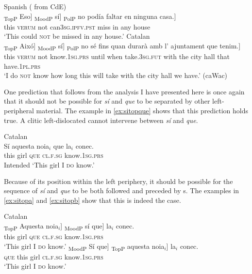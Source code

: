 \ea\label{ex:sino}
\ea\label{ex:sinosp}
		Spanish  (\citealt[94: ex 31a]{Kocher2017} from CdE)\\
\gll {\ob}\textsubscript{TopP} Eso] {\ob}\textsubscript{MoodP} sí] {\ob}\textsubscript{PolP} no podía faltar en ninguna casa.] \\
{} this {} \textsc{verum} {} not can\textsc{3sg.ipfv.pst} miss in any house\\
\glt `This could \textsc{not} be missed in any house.'
\ex\label{ex:sinocat} Catalan\\
\gll {\ob}\textsubscript{TopP} Aixó] {\ob}\textsubscript{MoodP} sí] {\ob}\textsubscript{PolP}  no sé fins quan durarà amb l' ajuntament que tenim.]\\
{} this {} \textsc{verum} {} not know.\textsc{1sg.prs} until when take.\textsc{3sg.fut} with the {city hall} that have.\textsc{1pl.prs}\\
\glt `I do \textsc{not} know how long this will take with the city hall we have.' (caWac)
\z
\z


One prediction that follows from the analysis I have presented here is once again that it should not be possible for \emph{sí} and \emph{que} to be separated by other left-peripheral material. The example in \eqref{ex:sitopque} shows that this prediction holds true. A clitic left-dislocated  cannot intervene between \emph{sí} and \emph{que}.

\ea\label{ex:sitopque}
Catalan\\
\gll * Sí aquesta noia$_i$ que la$_i$ conec. \\ 
{} \textsc{} this girl \textsc{que} \textsc{cl.f.sg} know.\textsc{1sg.prs}\\
\glt Intended `This girl I \textsc{do} know.'
\z


Because of its  position within the left periphery,  it should be possible for the sequence of \emph{sí} and \emph{que} to be both followed and preceded by s. The examples in  \eqref{ex:sitopa} and \eqref{ex:sitopb} show that this is indeed the case.\largerpage[2]


\ea 
\ea \label{ex:sitopa} Catalan \\ \gll {\ob}\textsubscript{TopP} Aquesta noia$_i$] {\ob}\textsubscript{MoodP} sí que] la$_i$ conec.\\
	{} this girl {}	\textsc{}  \textsc{que} \textsc{cl.f.sg} know.\textsc{1sg.prs}\\
	\glt `This girl I \textsc{do} know.'
		\ex\label{ex:sitopb}\gll  {\ob}\textsubscript{MoodP} Sí que] {\ob}\textsubscript{TopP} aquesta noia$_i$] la$_i$ conec.\\
		 {}	\textsc{}  \textsc{que} {} this girl \textsc{cl.f.sg} know.\textsc{1sg.prs}\\
	\glt `This girl I \textsc{do} know.'	
	\z
\z


